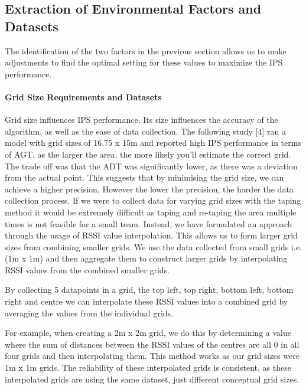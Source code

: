 \documentclass[runningheads]{llncs}
\begin{document}
\subsection{Extraction of Environmental Factors and Datasets}
The identification of the two factors in the previous section allows us to make adjustments to find the optimal setting for these values to maximize the IPS performance.

\paragraph{Grid Size Requirements and Datasets} Grid size influences IPS performance. Its size influences the accuracy of the algorithm, as well as the ease of data collection. The following study [4] ran a model with grid sizes of 16.75 x 15m and reported high IPS performance in terms of AGT, as the larger the area, the more likely you’ll estimate the correct grid. The trade off was that the ADT was significantly lower, as there was a deviation from the actual point. This suggests that by minimising the grid size, we can achieve a higher precision. However the lower the precision, the harder the data collection process. 
If we were to collect data for varying grid sizes with the taping method it would be extremely difficult as taping and re-taping the area multiple times is not feasible for a small team. Instead, we have formulated an approach through the usage of RSSI value interpolation. This allows us to form larger grid sizes from combining smaller grids. We use the data collected from small grids i.e. (1m x 1m) and then aggregate them to construct larger grids by interpolating RSSI values from the combined smaller grids.

By collecting 5 datapoints in a grid, the top left, top right, bottom left, bottom right and centre we can interpolate these RSSI values into a combined grid by averaging the values from the individual grids.

For example, when creating a 2m x 2m grid, we do this by determining a value where the sum of distances between the RSSI values of the centres are all 0 in all four grids and then interpolating them. This method works as our grid sizes were 1m x 1m grids. The reliability of these interpolated grids is consistent, as these interpolated grids are using the same dataset, just different conceptual grid sizes.
\end{document}
